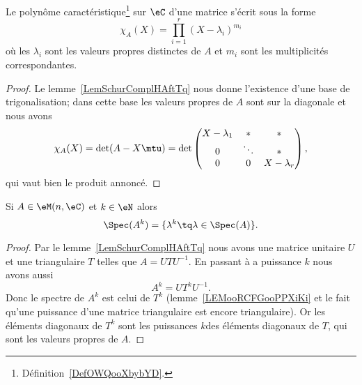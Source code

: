 \begin{corollary}   \label{CorUNZooAZULXT}
    Le polynôme caractéristique\footnote{Définition~\ref{DefOWQooXbybYD}.} sur \( \eC\) d'une matrice s'écrit sous la forme
    \begin{equation}
        \chi_A(X)=\prod_{i=1}^r(X-\lambda_i)^{m_i}
    \end{equation}
    où les \( \lambda_i\) sont les valeurs propres distinctes de \( A\) et \( m_i\) sont les multiplicités correspondantes.
\end{corollary}

\begin{proof}
    Le lemme~\ref{LemSchurComplHAftTq} nous donne l'existence d'une base de trigonalisation; dans cette base les valeurs propres de \( A\) sont sur la diagonale et nous avons
    \begin{equation}
        \chi_A(X)=\det(A-X\mtu)=\det\begin{pmatrix}
            X-\lambda_1    &   *    &   *    \\
            0    &   \ddots    &   *    \\
            0    &   0    &   X-\lambda_r
        \end{pmatrix},
    \end{equation}
    qui vaut bien le produit annoncé.
\end{proof}

\begin{corollary}       \label{CORooTPDHooXazTuZ}
    Si \( A\in \eM(n,\eC)\) et \( k\in \eN\) alors
    \begin{equation}
        \Spec(A^k)=\{ \lambda^k\tq \lambda\in \Spec(A) \}.
    \end{equation}
\end{corollary}

\begin{proof}
    Par le lemme~\ref{LemSchurComplHAftTq} nous avons une matrice unitaire \( U\) et une triangulaire \( T\) telles que \( A=UTU^{-1}\). En passant à a puissance \( k\) nous avons aussi
    \begin{equation}
        A^k=UT^kU^{-1}.
    \end{equation}
    Donc le spectre de \( A^k\) est celui de \( T^k\) (lemme~\ref{LEMooRCFGooPPXiKi} et le fait qu'une puissance d'une matrice triangulaire est encore triangulaire). Or les éléments diagonaux de \( T^k\) sont les puissances \( k\)\ieme des éléments diagonaux de \( T\), qui sont les valeurs propres de \( A\).
\end{proof}

